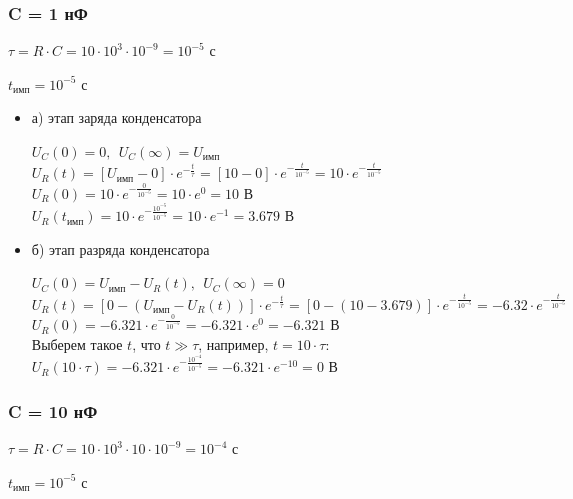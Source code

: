\documentclass[a4paper,14pt]{extarticle}
\begin{document}
\subsubsection{C = 1 нФ}

$\tau = R \cdot C = 10 \cdot 10^3 \cdot 10^{-9} = 10^{-5} \text{ с}$
		
$t_\text{имп} = 10^{-5} \text{ с}$

\begin{itemize}
\item[] а) этап заряда конденсатора

	$U_C(0)	= 0,\ \ U_C(\infty) = U_\text{имп}$\\
	$U_R(t) = [U_\text{имп} - 0] \cdot e^{-\frac{t}{\tau}} = [10 - 0] \cdot e^{-\frac{t}{10^{-5}}} = 10 \cdot e^{-\frac{t}{10^{-5}}}$\\
	$U_R(0) = 10 \cdot e^{-\frac{0}{10^{-5}}} = 10 \cdot e^0 = 10 \text{ В}$\\
	$U_R(t_\text{имп}) = 10 \cdot e^{-\frac{10^{-5}}{10^{-5}}} = 10 \cdot e^{-1} = 3.679 \text{ В}$

\item[] б) этап разряда конденсатора

	$U_C(0)	= U_\text{имп} - U_R(t),\ \ U_C(\infty) = 0$\\
	$U_R(t) = [0 - (U_\text{имп} - U_R(t))] \cdot e^{-\frac{t}{\tau}} = [0 - (10 - 3.679)] \cdot e^{-\frac{t}{10^{-5}}} = -6.32 \cdot e^{-\frac{t}{10^{-5}}}$\\
	$U_R(0) = -6.321 \cdot e^{-\frac{0}{10^{-5}}} = -6.321 \cdot e^0 = -6.321 \text{ В}$\\
	Выберем такое $t$, что $t \gg \tau$, например, $t = 10 \cdot \tau$:\\
	$U_R(10 \cdot \tau)	= -6.321 \cdot e^{-\frac{10^{-4}}{10^{-5}}} = -6.321 \cdot e^{-10} = 0 \text{ В}$
\end{itemize}

\subsubsection{C = 10 нФ}

$\tau = R \cdot C = 10 \cdot 10^3 \cdot 10 \cdot 10^{-9} = 10^{-4} \text{ с}$

$t_\text{имп} = 10^{-5} \text{ с}$
\end{document}
